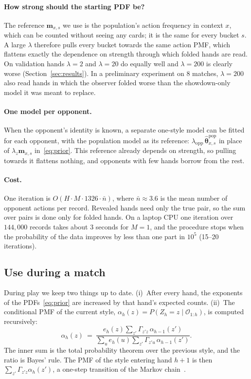 \documentclass[11pt,a4paper]{article}
\newcommand{\Z}{Z}            %
\newcommand{\1}{\mathbf{1}}
\newcommand{\BT}[1]{\cite[§#1]{bertsekas2000}}
\begin{document}
\paragraph{How strong should the starting PDF be?} The reference
$\mathbf{m}_{x,s}$ we use is the population's action frequency in context $x$,
which can be counted without seeing any cards; it is the same for every bucket
$s$. A large $\lambda$ therefore pulls every bucket towards the same action
PMF, which flattens exactly the dependence on strength through which folded
hands are read. On validation hands $\lambda=2$ and $\lambda=20$ do equally well
and $\lambda=200$ is clearly worse (Section~\ref{sec:results}). In a preliminary
experiment on 8 matches, $\lambda=200$ also read hands in which the observer
folded worse than the showdown-only model it was meant to replace.

\paragraph{One model per opponent.} When the opponent's identity is known, a
separate one-style model can be fitted for each opponent, with the population
model as its reference: $\lambda_{\text{opp}}\,\hat{\bm\theta}^{\text{pop}}_{x,s}$
in place of $\lambda_z\mathbf{m}_{x,s}$ in~\eqref{eq:prior}. This reference
already depends on strength, so pulling towards it flattens nothing, and
opponents with few hands borrow from the rest.

\paragraph{Cost.} One iteration is $O(H\cdot M\cdot 1326\cdot\bar n)$, where
$\bar n\approx 3.6$ is the mean number of opponent actions per record. Revealed
hands need only the true pair, so the sum over pairs is done only for folded
hands. On a laptop CPU one iteration over $144{,}000$ records takes about 3
seconds for $M=1$, and the procedure stops when the probability of the data
improves by less than one part in $10^5$ (15--20 iterations).

\subsection{Use during a match}\label{sec:session}
During play we keep two things up to date. (i)~After every hand, the exponents
of the PDFs~\eqref{eq:prior} are increased by that hand's expected counts.
(ii)~The conditional PMF of the current style,
$\alpha_h(z)=P(\Z_h=z\mid\mathcal{O}_{1:h})$, is computed recursively:
\begin{equation}
  \alpha_h(z)\ =\ \frac{e_h(z)\sum_{z'}\Gamma_{z'z}\,\alpha_{h-1}(z')}
  {\sum_{u}e_h(u)\sum_{z'}\Gamma_{z'u}\,\alpha_{h-1}(z')}.
  \label{eq:forward}
\end{equation}
The inner sum is the total probability theorem over the previous style, and
the ratio is Bayes' rule. The PMF of the style entering hand $h+1$ is then
$\sum_{z'}\Gamma_{z'z}\alpha_h(z')$, a one-step transition of the Markov
chain~\BT{6.1}.
\end{document}
